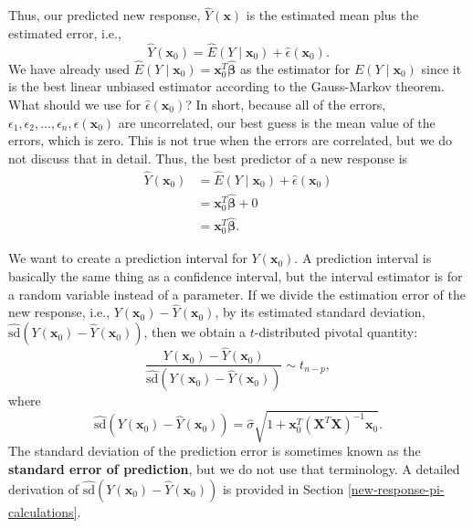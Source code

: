 \documentclass[
]{book}
\theoremstyle{definition}
\theoremstyle{definition}
\theoremstyle{definition}
\theoremstyle{definition}
\theoremstyle{remark}
\begin{document}
Thus, our predicted new response, \(\hat{Y}(\mathbf{x})\) is the estimated mean plus the estimated error, i.e.,
\[
\hat{Y}(\mathbf{x}_0)=\hat{E}(Y\mid \mathbf{x}_0) + \hat{\epsilon}(\mathbf{x}_0).
\]
We have already used \(\hat{E}(Y\mid \mathbf{x}_0)=\mathbf{x}_0^T\hat{\boldsymbol{\beta}}\) as the estimator for \(E(Y\mid \mathbf{x}_0)\) since it is the best linear unbiased estimator according to the Gauss-Markov theorem. What should we use for \(\hat{\epsilon}(\mathbf{x}_0)\)? In short, because all of the errors, \(\epsilon_1, \epsilon_2,\ldots, \epsilon_n, \epsilon(\mathbf{x}_0)\) are uncorrelated, our best guess is the mean value of the errors, which is zero. This is not true when the errors are correlated, but we do not discuss that in detail. Thus, the best predictor of a new response is
\[
\begin{aligned}
\hat{Y}(\mathbf{x}_0) &=\hat{E}(Y\mid \mathbf{x}_0) + \hat{\epsilon}(\mathbf{x}_0)\\
&= \mathbf{x}_0^T\hat{\boldsymbol{\beta}} + 0 \\
&= \mathbf{x}_0^T\hat{\boldsymbol{\beta}}.
\end{aligned}
\]

We want to create a prediction interval for \(Y(\mathbf{x}_0)\). A prediction interval is basically the same thing as a confidence interval, but the interval estimator is for a random variable instead of a parameter. If we divide the estimation error of the new response, i.e.,
\(Y(\mathbf{x}_0)-\hat{Y}(\mathbf{x}_0)\), by its estimated standard deviation, \(\widehat{\mathrm{sd}}(Y(\mathbf{x}_0)-\hat{Y}(\mathbf{x}_0))\), then we obtain a \(t\)-distributed pivotal quantity:
\[
\frac{Y(\mathbf{x}_0)-\hat{Y}(\mathbf{x}_0)}{\widehat{\mathrm{sd}}(Y(\mathbf{x}_0)-\hat{Y}(\mathbf{x}_0))} \sim t_{n-p},
\]
where
\[
\widehat{\mathrm{sd}}(Y(\mathbf{x}_0)-\hat{Y}(\mathbf{x}_0))=\hat{\sigma}\sqrt{1 + \mathbf{x}_0^T (\mathbf{X}^T \mathbf{X})^{-1}\mathbf{x}_0}. \label{eq:sdhat-pred-error}
\]
The standard deviation of the prediction error is sometimes known as the \textbf{standard error of prediction}, but we do not use that terminology. A detailed derivation of \(\widehat{\mathrm{sd}}(Y(\mathbf{x}_0)-\hat{Y}(\mathbf{x}_0))\) is provided in Section \ref{new-response-pi-calculations}.
\end{document}
